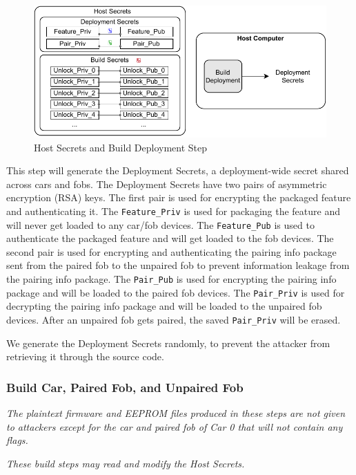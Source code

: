 \documentclass[11pt,oneside,onecolumn,letterpaper]{article}
\begin{document}
\begin{figure}[!htbp]
	\begin{centering}
		\includegraphics[width = .6\textwidth]{pic/build_depl.pdf}
		\caption{Host Secrets and Build Deployment Step}
		\label{fig:build_depl}
	\end{centering}
\end{figure}

This step will generate the Deployment Secrets, a deployment-wide secret shared across cars and fobs.
The Deployment Secrets have two pairs of asymmetric encryption (RSA) keys.
The first pair is used for encrypting the packaged feature and authenticating it.
The \verb|Feature_Priv| is used for packaging the feature and will never get loaded to any car/fob devices.
The \verb|Feature_Pub| is used to authenticate the packaged feature and will get loaded to the fob devices.
The second pair is used for encrypting and authenticating the pairing info package sent from the paired fob to the unpaired fob to prevent information leakage from the pairing info package.
The \verb|Pair_Pub| is used for encrypting the pairing info package and will be loaded to the paired fob devices.
The \verb|Pair_Priv| is used for decrypting the pairing info package and will be loaded to the unpaired fob devices.
After an unpaired fob gets paired, the saved \verb|Pair_Priv| will be erased.

We generate the Deployment Secrets randomly, to prevent the attacker from retrieving it through the source code.

\subsubsection{Build Car, Paired Fob, and Unpaired Fob}

\textit{The plaintext firmware and EEPROM files produced in these steps are not given to attackers except for the car and paired fob of Car 0 that will not contain any flags.}

\textit{These build steps may read and modify the Host Secrets.}
\end{document}
